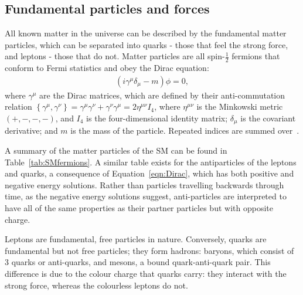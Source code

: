 \subsection{Fundamental particles and forces}
All known matter in the universe can be described by the fundamental matter particles, which can be separated into quarks - those that feel the strong force, and leptons - those that do not.
Matter particles are all spin-$\frac{1}{2}$ fermions that conform to Fermi statistics and obey the Dirac equation:
%
\begin{eqnarray}
\label{eqn:Dirac}
(i \gamma ^{\mu} \delta_{\mu} - m) \phi =0,
\end{eqnarray}
%
where $\gamma^{\mu}$ are the Dirac matrices, which are defined by their anti-commutation relation 
$\left\{ \gamma^{\mu}, \gamma^{\nu} \right\} = \gamma^{\mu} \gamma^{\nu} + \gamma^{\nu} \gamma^{\mu} = 2 \eta^{\mu\nu}I_{4}$,
where
$ \eta^{\mu\nu} $ is the Minkowski metric $(+, -, -, -)$, and $I_{4}$ is the four-dimensional identity matrix;
$\delta_{\mu}$ is the covariant derivative; and $m$ is the mass of the particle.
Repeated indices are summed over~\cite{HalzenMartin}.

A summary of the matter particles of the \ac{SM} can be found in Table~\ref{tab:SMfermions}. 
A similar table exists for the antiparticles of the leptons and quarks, a consequence of Equation~\ref{eqn:Dirac}, which has both positive and negative energy solutions. 
Rather than particles travelling backwards through time, as the negative energy solutions suggest, anti-particles are interpreted to have all of the same properties as their partner particles but with opposite charge.

%
Leptons are fundamental, free particles in nature. Conversely, quarks are fundamental but not free particles; they form hadrons: baryons, which consist of 3 quarks or anti-quarks, and mesons, a bound quark-anti-quark pair. 
This difference is due to the colour charge that quarks carry: they interact with the strong force, whereas the colourless leptons do not. 

